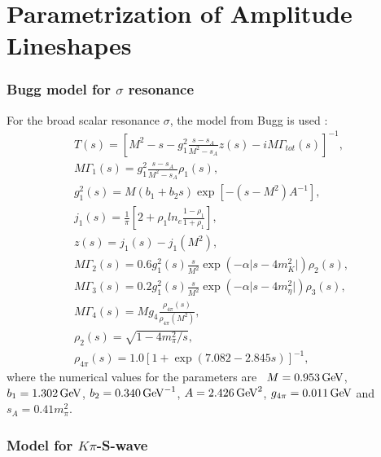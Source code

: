 
\section{Parametrization of Amplitude Lineshapes}
\label{sec:AmpLineShapes}

\subsubsection*{Bugg model for $\sigma$ resonance}

 For the broad scalar resonance $\sigma$,
     the model from Bugg is used \cite{BuggSigma}:
\begin{eqnarray}
T(s) = [M^{2} - s - g^{2}_{1}\frac{s - s_{A}}{M^{2} - s_{A}} z(s) -iM\Gamma_{tot}(s)]^{-1},\\
M\Gamma_{1}(s) = g^{2}_{1}\frac{s - s_{A}}{M^{2} - s_{A}}\rho_{1}(s),\\
g^{2}_{1}(s) = M(b_{1} + b_{2}s)\exp[-(s-M^{2})A^{-1}],\\
j_{1}(s) = \frac{1}{\pi}[2 + \rho_{1}ln_{e}\frac{1 - \rho_{1}}{1 + \rho_{1}}],\\
z(s) = j_{1}(s) - j_{1}(M^{2}),\\
M\Gamma_{2}(s) = 0.6 g^{2}_{1}(s)\frac{s}{M^{2}}\exp(-\alpha \vert s - 4m^{2}_{K}\vert)\rho_{2}(s),\\
M\Gamma_{3}(s) = 0.2 g^{2}_{1}(s)\frac{s}{M^{2}}\exp(-\alpha \vert s - 4m^{2}_{\eta}\vert)\rho_{3}(s),\\
M\Gamma_{4}(s) = M g_{4}\frac{\rho_{4\pi}(s)}{\rho_{4\pi}(M^{2})},\\
\rho_{2}(s) = \sqrt{1-4m_\pi^2/s},   \\
\rho_{4\pi}(s) = 1.0 [1 + \exp(7.082 - 2.845 s)]^{-1},
\end{eqnarray}
where the numerical values for the parameters are~\cite{BuggSigma} $M = 0.953 \mathrm{\,Ge\kern -0.1em V}$, $b_{1} = 1.302 \mathrm{\,Ge\kern -0.1em V}$, $b_{2} = 0.340 \mathrm{\,Ge\kern -0.1em V}^{-1}$, $A = 2.426 \mathrm{\,Ge\kern -0.1em V}^{2}$, $g_{4\pi} = 0.011 \mathrm{\,Ge\kern -0.1em V}$
and $s_A = 0.41 m_\pi^2$.

\subsubsection*{Model for $K\pi$-S-wave}

